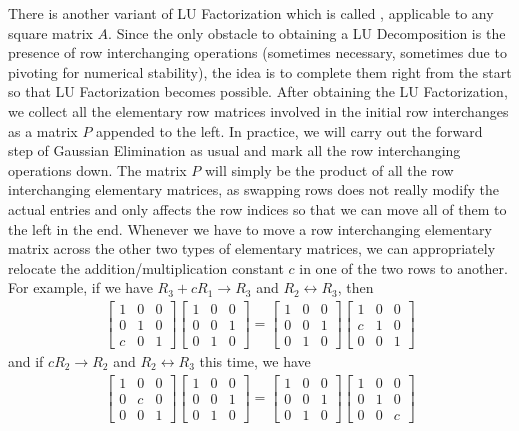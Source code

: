There is another variant of LU Factorization which is called , applicable to any square matrix $A$. Since the only obstacle to obtaining a LU Decomposition is the presence of row interchanging operations (sometimes necessary, sometimes due to pivoting for numerical stability), the idea is to complete them right from the start so that LU Factorization becomes possible. After obtaining the LU Factorization, we collect all the elementary row matrices involved in the initial row interchanges as a matrix $P$ appended to the left. In practice, we will carry out the forward step of Gaussian Elimination as usual and mark all the row interchanging operations down. The matrix $P$ will simply be the product of all the row interchanging elementary matrices, as swapping rows does not really modify the actual entries and only affects the row indices so that we can move all of them to the left in the end. Whenever we have to move a row interchanging elementary matrix across the other two types of elementary matrices, we can appropriately relocate the addition/multiplication constant $c$ in one of the two rows to another. For example, if we have $R_3 + cR_1 \to R_3$ and $R_2 \leftrightarrow R_3$, then
\begin{align*}
\begin{bmatrix}
1 & 0 & 0 \\
0 & 1 & 0 \\
c & 0 & 1
\end{bmatrix}
\begin{bmatrix}
1 & 0 & 0 \\
0 & 0 & 1 \\
0 & 1 & 0
\end{bmatrix}
=
\begin{bmatrix}
1 & 0 & 0 \\
0 & 0 & 1 \\
0 & 1 & 0
\end{bmatrix}
\begin{bmatrix}
1 & 0 & 0 \\
c & 1 & 0 \\
0 & 0 & 1
\end{bmatrix}
\end{align*}
and if $cR_2 \to R_2$ and $R_2 \leftrightarrow R_3$ this time, we have
\begin{align*}
\begin{bmatrix}
1 & 0 & 0 \\
0 & c & 0 \\
0 & 0 & 1
\end{bmatrix}
\begin{bmatrix}
1 & 0 & 0 \\
0 & 0 & 1 \\
0 & 1 & 0
\end{bmatrix}
=
\begin{bmatrix}
1 & 0 & 0 \\
0 & 0 & 1 \\
0 & 1 & 0
\end{bmatrix}
\begin{bmatrix}
1 & 0 & 0 \\
0 & 1 & 0 \\
0 & 0 & c
\end{bmatrix}
\end{align*}
